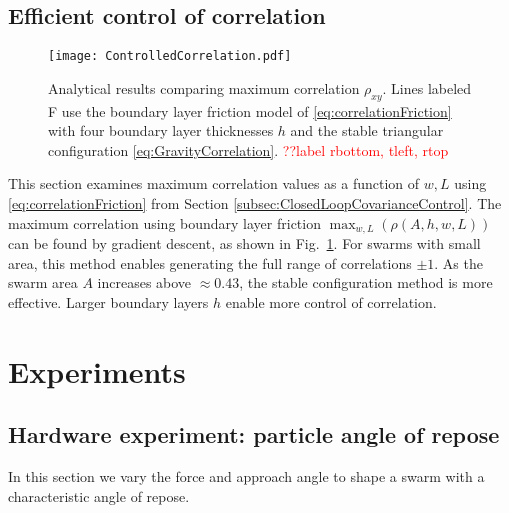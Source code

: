 \subsection{Efficient control of correlation}
\begin{figure}
\begin{center}
	\texttt{[image: ControlledCorrelation.pdf]}
\end{center}
\vspace{-1em}
\caption{\label{fig:ControlledCorrelation}
Analytical results comparing maximum correlation $\rho_{xy}$. Lines labeled \textsf{F} use the boundary layer friction model of \eqref{eq:correlationFriction} with four boundary layer thicknesses $h$ and the stable triangular configuration \eqref{eq:GravityCorrelation}.
\textcolor{red}{??label rbottom, tleft, rtop}
}\end{figure}

This section examines maximum correlation values as a function of  $w,L$ using \eqref{eq:correlationFriction}
from Section  \ref{subsec:ClosedLoopCovarianceControl}. 
The maximum correlation using boundary layer friction $\displaystyle  \max_{w,L} \left( \rho(A,h,w,L) \right)$ can be found by gradient descent, as shown in Fig.~\ref{fig:ControlledCorrelation}. 
For swarms with small area, this method enables generating the full range of correlations $\pm 1$. %
  As  the swarm area $A$ increases above $\approx 0.43$, the stable configuration method is more effective.
Larger boundary layers $h$ enable more control of correlation.





\section{Experiments}\label{sec:Experiments}

\subsection{Hardware experiment: particle angle of repose}
In this section we vary the force and approach angle to shape a swarm with a characteristic angle of repose.  



